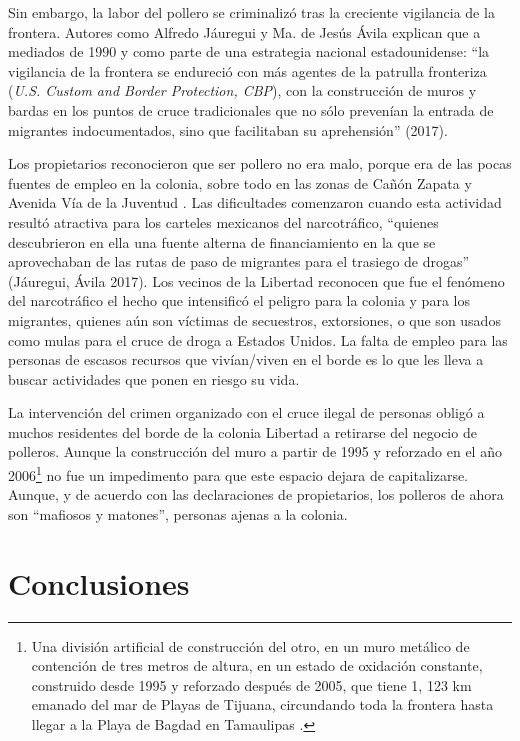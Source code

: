 \documentclass[
  spanish,
  11pt,
  a4paper,
]{scrbook}
\begin{document}
Sin embargo, la labor del pollero se criminalizó tras la creciente
vigilancia de la frontera. Autores como Alfredo Jáuregui y Ma. de Jesús
Ávila explican que a mediados de 1990 y como parte de una estrategia
nacional estadounidense: ``la vigilancia de la frontera se endureció con
más agentes de la patrulla fronteriza (\emph{U.S. Custom and Border
Protection, CBP}), con la construcción de muros y bardas en los puntos
de cruce tradicionales que no sólo prevenían la entrada de migrantes
indocumentados, sino que facilitaban su aprehensión'' (2017).

Los propietarios reconocieron que ser pollero no era malo, porque era de
las pocas fuentes de empleo en la colonia, sobre todo en las zonas de
Cañón Zapata y Avenida Vía de la Juventud \autocite{LopezReyes2021}. Las
dificultades comenzaron cuando esta actividad resultó atractiva para los
carteles mexicanos del narcotráfico, ``quienes descubrieron en ella una
fuente alterna de financiamiento en la que se aprovechaban de las rutas
de paso de migrantes para el trasiego de drogas'' (Jáuregui, Ávila
2017). Los vecinos de la Libertad reconocen que fue el fenómeno del
narcotráfico el hecho que intensificó el peligro para la colonia y para
los migrantes, quienes aún son víctimas de secuestros, extorsiones, o
que son usados como mulas para el cruce de droga a Estados Unidos. La
falta de empleo para las personas de escasos recursos que vivían/viven
en el borde es lo que les lleva a buscar actividades que ponen en riesgo
su vida.

La intervención del crimen organizado con el cruce ilegal de personas
obligó a muchos residentes del borde de la colonia Libertad a retirarse
del negocio de polleros. Aunque la construcción del muro a partir de
1995 y reforzado en el año 2006\footnote{Una división artificial de
  construcción del otro, en un muro metálico de contención de tres
  metros de altura, en un estado de oxidación constante, construido
  desde 1995 y reforzado después de 2005, que tiene 1, 123 km emanado
  del mar de Playas de Tijuana, circundando toda la frontera hasta
  llegar a la Playa de Bagdad en Tamaulipas \autocite{LopezReyes2021}.}
no fue un impedimento para que este espacio dejara de capitalizarse.
Aunque, y de acuerdo con las declaraciones de propietarios, los polleros
de ahora son ``mafiosos y matones'', personas ajenas a la colonia.

\section*{Conclusiones}\label{conclusiones-2}
\end{document}

